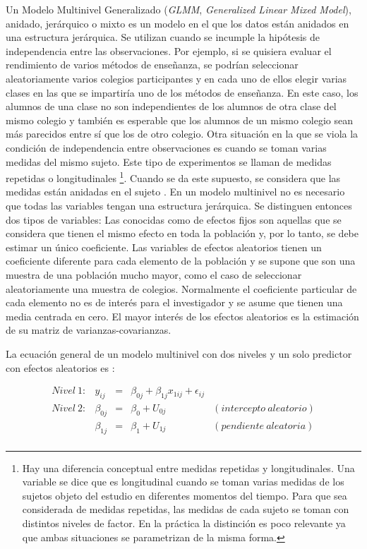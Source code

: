 \documentclass[
  12pt,
  a4paper,
  extrafontsizes,
  onecolumn,
  openright,
  table]{memoir}
\begin{document}
Un Modelo Multinivel Generalizado (\emph{\gls{GLMM}}, \emph{Generalized
Linear Mixed Model}), anidado, jerárquico o mixto es un modelo en el que
los datos están anidados en una estructura jerárquica. Se utilizan
cuando se incumple la hipótesis de independencia entre las
observaciones. Por ejemplo, si se quisiera evaluar el rendimiento de
varios métodos de enseñanza, se podrían seleccionar aleatoriamente
varios colegios participantes y en cada uno de ellos elegir varias
clases en las que se impartiría uno de los métodos de enseñanza. En este
caso, los alumnos de una clase no son independientes de los alumnos de
otra clase del mismo colegio y también es esperable que los alumnos de
un mismo colegio sean más parecidos entre sí que los de otro colegio.
Otra situación en la que se viola la condición de independencia entre
observaciones es cuando se toman varias medidas del mismo sujeto. Este
tipo de experimentos se llaman de medidas repetidas o longitudinales
\footnote{Hay una diferencia conceptual entre medidas repetidas y
  longitudinales. Una variable se dice que es longitudinal cuando se
  toman varias medidas de los sujetos objeto del estudio en diferentes
  momentos del tiempo. Para que sea considerada de medidas repetidas,
  las medidas de cada sujeto se toman con distintos niveles de factor.
  En la práctica la distinción es poco relevante ya que ambas
  situaciones se parametrizan de la misma forma.}. Cuando se da este
supuesto, se considera que las medidas están anidadas en el sujeto
\autocite[ver][]{Liu2202}. En un modelo multinivel no es necesario que
todas las variables tengan una estructura jerárquica. Se distinguen
entonces dos tipos de variables: Las conocidas como de efectos fijos son
aquellas que se considera que tienen el mismo efecto en toda la
población y, por lo tanto, se debe estimar un único coeficiente. Las
variables de efectos aleatorios tienen un coeficiente diferente para
cada elemento de la población y se supone que son una muestra de una
población mucho mayor, como el caso de seleccionar aleatoriamente una
muestra de colegios. Normalmente el coeficiente particular de cada
elemento no es de interés para el investigador y se asume que tienen una
media centrada en cero. El mayor interés de los efectos aleatorios es la
estimación de su matriz de varianzas-covarianzas.

La ecuación general de un modelo multinivel con dos niveles y un solo
predictor con efectos aleatorios es \autocite[ver][pp.~40]{chen2021}:

\[
\begin{aligned}
Nivel\ 1: & y_{ij}     & = & \beta_{0j} + \beta_{1j}x_{1ij} + \epsilon_{ij} \\
Nivel\ 2: & \beta_{0j} & = & \beta_{0} + U_{0j} & (intercepto\ aleatorio) \\
          & \beta_{1j} & = & \beta_{1} + U_{1j} & (pendiente\ aleatoria) \\
\end{aligned}
\]
\end{document}
